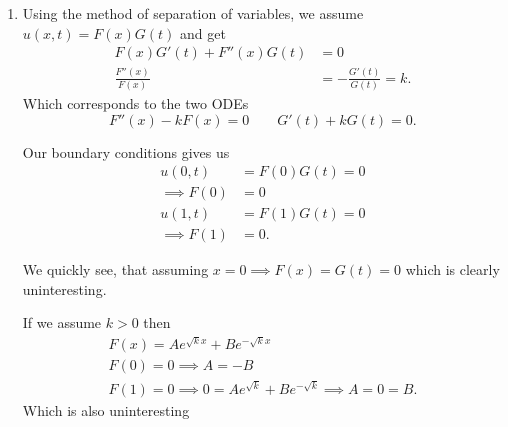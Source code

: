 \begin{derivation}
  \begin{enumerate}[label=\alph*)]
    \item Using the method of separation of variables, we assume $u(x,t) = F(x) G(t)$ and get
      \begin{align*}
        F(x) G'(t) + F''(x) G(t) &= 0 \\
        \frac{F''(x)}{F(x)} &= - \frac{G'(t)}{G(t)} = k
      .\end{align*}
      Which corresponds to the two ODEs
      \begin{equation*}
        F''(x) - k F(x) = 0 \qquad G'(t) + kG(t) = 0
      .\end{equation*}
      
      Our boundary conditions gives us
      \begin{align*}
        u(0,t) &= F(0) G(t) = 0 \\
        \implies F(0) &= 0 \\
        u(1,t) &= F(1) G(t) = 0 \\
        \implies F(1) &= 0
      .\end{align*}

      We quickly see, that assuming $x = 0 \implies F(x) = G(t) = 0$ which is clearly uninteresting.

      If we assume $k > 0$ then
      \begin{gather*}
        F(x) = A e^{\sqrt{k}x} + B e^{- \sqrt{k}x} \\
        F(0) = 0 \implies A = -B \\
        F(1) = 0 \implies 0 = Ae^{\sqrt{k}} + Be^{-\sqrt{k}}
        \implies A = 0 = B
      .\end{gather*}
      Which is also uninteresting


\end{enumerate}
\end{derivation}
